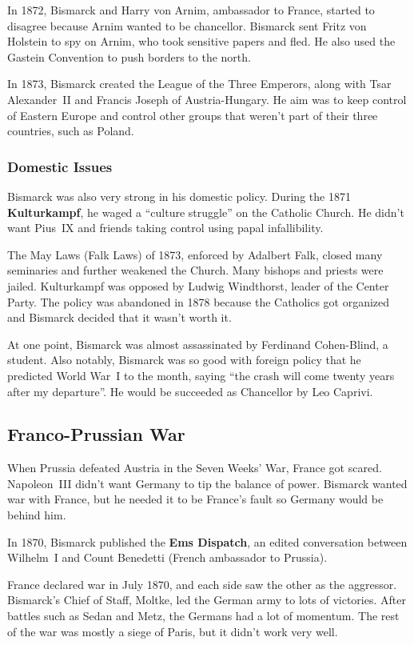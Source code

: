 In 1872, Bismarck and Harry von Arnim, ambassador to France, started to disagree because Arnim wanted to be chancellor.
Bismarck sent Fritz von Holstein to spy on Arnim, who took sensitive papers and fled.
He also used the Gastein Convention to push borders to the north.

In 1873, Bismarck created the League of the Three Emperors,
along with Tsar Alexander~II and Francis Joseph of Austria-Hungary.
He aim was to keep control of Eastern Europe and control other groups that weren't part of their three countries,
such as Poland.

\subsubsection*{Domestic Issues}

Bismarck was also very strong in his domestic policy.
During the 1871 \textbf{Kulturkampf}, he waged a ``culture struggle'' on the Catholic Church.
He didn't want Pius~IX and friends taking control using papal infallibility.

The May Laws (Falk Laws) of 1873, enforced by Adalbert Falk, closed many seminaries and further weakened the Church.
Many bishops and priests were jailed.
Kulturkampf was opposed by Ludwig Windthorst, leader of the Center Party.
The policy was abandoned in 1878 because the Catholics got organized and Bismarck decided that it wasn't worth it.

At one point, Bismarck was almost assassinated by Ferdinand Cohen-Blind, a student.
Also notably, Bismarck was so good with foreign policy that he predicted World War~I to the month,
saying ``the crash will come twenty years after my departure''.
He would be succeeded as Chancellor by Leo Caprivi.

\subsection*{Franco-Prussian War}

When Prussia defeated Austria in the Seven Weeks' War, France got scared.
Napoleon~III didn't want Germany to tip the balance of power.
Bismarck wanted war with France, but he needed it to be France's fault so Germany would be behind him.

In 1870, Bismarck published the \textbf{Ems Dispatch},
an edited conversation between Wilhelm~I and Count Benedetti (French ambassador to Prussia).

France declared war in July 1870, and each side saw the other as the aggressor.
Bismarck's Chief of Staff, Moltke, led the German army to lots of victories.
After battles such as Sedan and Metz, the Germans had a lot of momentum.
The rest of the war was mostly a siege of Paris, but it didn't work very well.

